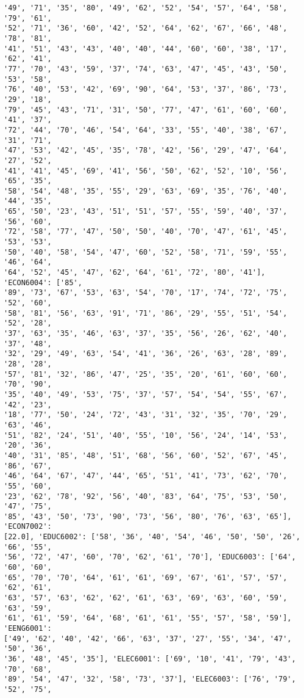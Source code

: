 \documentclass[11pt]{article}
\begin{document}
\begin{Verbatim}[commandchars=\\\{\}]
'49', '71', '35', '80', '49', '62', '52', '54', '57', '64', '58', '79', '61',
'52', '71', '36', '60', '42', '52', '64', '62', '67', '66', '48', '78', '81',
'41', '51', '43', '43', '40', '40', '44', '60', '60', '38', '17', '62', '41',
'77', '70', '43', '59', '37', '74', '63', '47', '45', '43', '50', '53', '58',
'76', '40', '53', '42', '69', '90', '64', '53', '37', '86', '73', '29', '18',
'79', '45', '43', '71', '31', '50', '77', '47', '61', '60', '60', '41', '37',
'72', '44', '70', '46', '54', '64', '33', '55', '40', '38', '67', '31', '71',
'47', '53', '42', '45', '35', '78', '42', '56', '29', '47', '64', '27', '52',
'41', '41', '45', '69', '41', '56', '50', '62', '52', '10', '56', '65', '35',
'58', '54', '48', '35', '55', '29', '63', '69', '35', '76', '40', '44', '35',
'65', '50', '23', '43', '51', '51', '57', '55', '59', '40', '37', '56', '60',
'72', '58', '77', '47', '50', '50', '40', '70', '47', '61', '45', '53', '53',
'50', '40', '58', '54', '47', '60', '52', '58', '71', '59', '55', '46', '64',
'64', '52', '45', '47', '62', '64', '61', '72', '80', '41'], 'ECON6004': ['85',
'89', '73', '67', '53', '63', '54', '70', '17', '74', '72', '75', '52', '60',
'58', '81', '56', '63', '91', '71', '86', '29', '55', '51', '54', '52', '28',
'37', '63', '35', '46', '63', '37', '35', '56', '26', '62', '40', '37', '48',
'32', '29', '49', '63', '54', '41', '36', '26', '63', '28', '89', '28', '28',
'57', '81', '32', '86', '47', '25', '35', '20', '61', '60', '60', '70', '90',
'35', '40', '49', '53', '75', '37', '57', '54', '54', '55', '67', '42', '23',
'18', '77', '50', '24', '72', '43', '31', '32', '35', '70', '29', '63', '46',
'51', '82', '24', '51', '40', '55', '10', '56', '24', '14', '53', '20', '36',
'40', '31', '85', '48', '51', '68', '56', '60', '52', '67', '45', '86', '67',
'46', '64', '67', '47', '44', '65', '51', '41', '73', '62', '70', '55', '60',
'23', '62', '78', '92', '56', '40', '83', '64', '75', '53', '50', '47', '75',
'85', '43', '50', '73', '90', '73', '56', '80', '76', '63', '65'], 'ECON7002':
[22.0], 'EDUC6002': ['58', '36', '40', '54', '46', '50', '50', '26', '66', '55',
'56', '72', '47', '60', '70', '62', '61', '70'], 'EDUC6003': ['64', '60', '60',
'65', '70', '70', '64', '61', '61', '69', '67', '61', '57', '57', '62', '61',
'63', '57', '63', '62', '62', '61', '63', '69', '63', '60', '59', '63', '59',
'61', '61', '59', '64', '68', '61', '61', '55', '57', '58', '59'], 'EENG6001':
['49', '62', '40', '42', '66', '63', '37', '27', '55', '34', '47', '50', '36',
'36', '48', '45', '35'], 'ELEC6001': ['69', '10', '41', '79', '43', '70', '68',
'89', '54', '47', '32', '58', '73', '37'], 'ELEC6003': ['76', '79', '52', '75',

\end{Verbatim}
\end{document}
